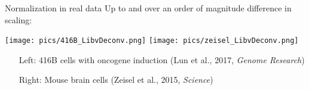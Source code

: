 \documentclass{beamer}
\begin{document}
\begin{frame}{Normalization in real data}
Up to and over an order of magnitude difference in scaling:
\begin{center}
\texttt{[image: pics/416B\_LibvDeconv.png]}\vspace{0.1in}
\texttt{[image: pics/zeisel\_LibvDeconv.png]}
\end{center}
\begin{itemize}
\item[Left:] 416B cells with oncogene induction {\tiny (Lun et al., 2017, \textit{Genome Research})}
\item[Right:] Mouse brain cells {\tiny (Zeisel et al., 2015, \textit{Science})}
\end{itemize}
\end{frame}
\end{document}
